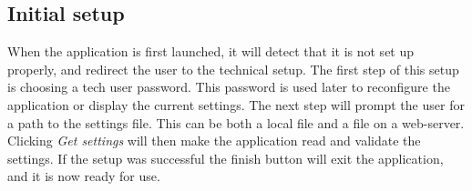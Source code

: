 \subsection{Initial setup}
When the application is first launched, it will detect that it is not set up properly, and redirect the user to the technical setup. The first step of this setup is choosing a tech user password. This password is used later to reconfigure the application or display the current settings. The next step will prompt the user for a path to the settings file. This can be both a local file and a file on a web-server. Clicking \textit{Get settings} will then make the application read and validate the settings. If the setup was successful the finish button will exit the application, and it is now ready for use.